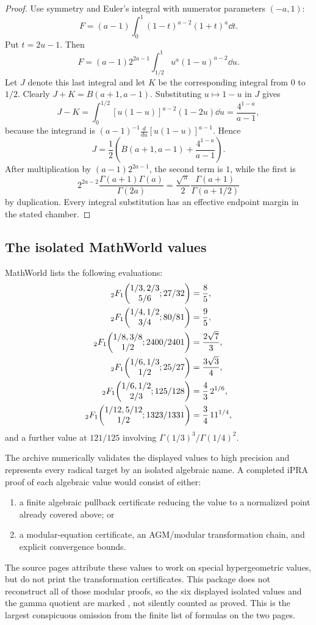 \begin{proof}
Use symmetry and Euler's integral with numerator parameters \((-a,1)\):
\[
 F=(a-1)\int_0^1(1-t)^{a-2}(1+t)^a\dd t.
\]
Put \(t=2u-1\).  Then
\[
 F=(a-1)2^{2a-1}\int_{1/2}^1u^a(1-u)^{a-2}\dd u.
\]
Let \(J\) denote this last integral and let \(K\) be the corresponding
integral from \(0\) to \(1/2\).  Clearly
\(J+K=B(a+1,a-1)\).  Substituting \(u\mapsto1-u\) in \(J\) gives
\[
 J-K=\int_0^{1/2}[u(1-u)]^{a-2}(1-2u)\dd u
 =\frac{4^{1-a}}{a-1},
\]
because the integrand is
\((a-1)^{-1}\frac{d}{du}[u(1-u)]^{a-1}\).  Hence
\[
 J=\frac12\left(B(a+1,a-1)+\frac{4^{1-a}}{a-1}\right).
\]
After multiplication by \((a-1)2^{2a-1}\), the second term is \(1\), while
the first is
\[
 2^{2a-2}\frac{\Gamma(a+1)\Gamma(a)}{\Gamma(2a)}
 =\frac{\sqrt\pi}{2}\frac{\Gamma(a+1)}{\Gamma(a+1/2)}
\]
by duplication.  Every integral substitution has an effective endpoint
margin in the stated chamber.
\end{proof}

\subsection{The isolated MathWorld values}

MathWorld lists the following evaluations:
\begin{align*}
 {}_2F_1\!\left(\begin{matrix}1/3,2/3\\5/6\end{matrix};27/32\right)&=\frac85,\\
 {}_2F_1\!\left(\begin{matrix}1/4,1/2\\3/4\end{matrix};80/81\right)&=\frac95,\\
 {}_2F_1\!\left(\begin{matrix}1/8,3/8\\1/2\end{matrix};2400/2401\right)&=\frac{2\sqrt7}{3},\\
 {}_2F_1\!\left(\begin{matrix}1/6,1/3\\1/2\end{matrix};25/27\right)&=\frac{3\sqrt3}{4},\\
 {}_2F_1\!\left(\begin{matrix}1/6,1/2\\2/3\end{matrix};125/128\right)&=\frac43\,2^{1/6},\\
 {}_2F_1\!\left(\begin{matrix}1/12,5/12\\1/2\end{matrix};1323/1331\right)&=\frac34\,11^{1/4},
\end{align*}
and a further value at \(121/125\) involving
\(\Gamma(1/3)^3/\Gamma(1/4)^2\).

\begin{audit}\label{audit:isolated-values}
The archive numerically validates the displayed values to high precision and
represents every radical target by an isolated algebraic name.  A completed
iPRA proof of each algebraic value would consist of either:
\begin{enumerate}
\item a finite algebraic pullback certificate reducing the value to a
normalized point already covered above; or
\item a modular-equation certificate, an AGM/modular transformation chain,
and explicit convergence bounds.
\end{enumerate}
The source pages attribute these values to work on special hypergeometric
values, but do not print the transformation certificates.  This package does
not reconstruct all of those modular proofs, so the six displayed isolated
values and the gamma quotient are marked \StatusD{}, not silently counted as
proved.  This is the largest conspicuous omission from the finite list of
formulas on the two pages.
\end{audit}
